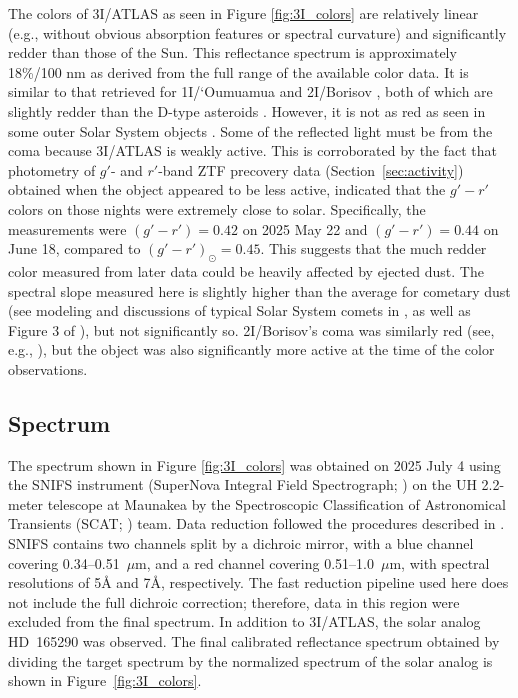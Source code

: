 \documentclass[twocolumn,longbib]{aastex7}
\begin{document}
\begin{CJK*}{UTF8}{gbsn}
The colors of 3I/ATLAS as seen in Figure \ref{fig:3I_colors} are relatively linear (e.g., without obvious absorption features or spectral curvature) and significantly redder than those of the Sun. This reflectance spectrum is approximately 18\%/100 nm as derived from the full range of the available color data. It is similar to that retrieved for 1I/`Oumuamua \citep{Ye2017} and 2I/Borisov  \citep{deleon2020}, both of which are slightly redder than the D-type asteroids \citep{DeMeo2009}. However, it is not as red as seen in some outer Solar System objects  \citep[e.g. Pholus,][]{Binzel1992}.  Some of the reflected light must be from the coma because 3I/ATLAS is weakly active.  This is corroborated by the fact that photometry of $g'$- and $r'$-band ZTF precovery data (Section~\ref{sec:activity}) obtained when the object appeared to be less active, indicated that the $g'-r'$ colors on those nights were extremely close to solar. Specifically, the measurements were $(g'-r')=0.42$ on 2025 May 22 and $(g'-r')=0.44$ on June 18, compared to $(g'-r')_{\odot}=0.45$\citep{holmberg2006_solarcolors}. This suggests that the much redder color measured from later data could be heavily affected by ejected dust.
The spectral slope measured here is slightly higher than the average for cometary dust (see modeling and discussions of typical Solar System comets in \citealt{protopapa2018, kareta_noonan23}, as well as Figure 3 of \citealt{2024come.book..621K}), but not significantly so. 2I/Borisov's coma was similarly red (see, e.g., \citealt{deleon2020}), but the object was also significantly more active at the time of the color observations.

\subsection{Spectrum}\label{sec:spectrum}

The spectrum shown in Figure \ref{fig:3I_colors} was obtained on 2025 July 4 using the SNIFS instrument (SuperNova Integral Field Spectrograph; \citealp{Lantz2004}) on the UH 2.2-meter telescope at Maunakea by the Spectroscopic Classification of Astronomical Transients (SCAT; \citealp{Tucker2022}) team. Data reduction followed the procedures described in \citet{Tucker2022}. SNIFS contains two channels split by a dichroic mirror, with a blue channel covering 0.34--0.51~$\mu$m, and a red channel covering 0.51--1.0~$\mu$m, with spectral resolutions of 5\r{A} and 7\r{A}, respectively. The fast reduction pipeline used here does not include the full dichroic correction; therefore, data in this region were excluded from the final spectrum. In addition to 3I/ATLAS, the solar analog HD~165290 was observed. The final calibrated reflectance spectrum obtained by dividing the target spectrum by the normalized spectrum of the solar analog is shown in Figure~\ref{fig:3I_colors}.


\end{CJK*}
\end{document}
